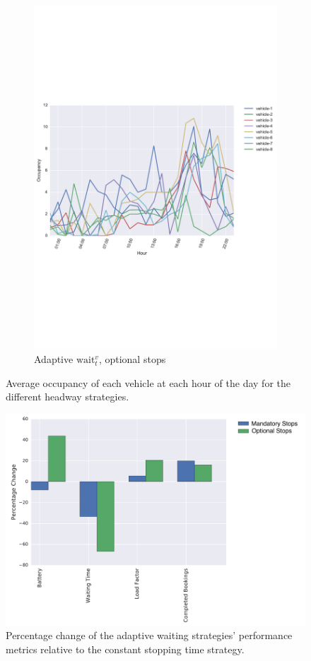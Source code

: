 \documentclass[12pt,a4paper]{article}
\begin{document}
\begin{figure}
\begin{subfigure}[b]{0.49\textwidth}
  \includegraphics[width=\linewidth]{./images/optionalstops}
  \caption{Adaptive $\text{wait}_t^{v}$, optional stops}
  \label{skipload}
\end{subfigure}
\label{simuload}
\caption{Average occupancy of each vehicle at each hour of the day for the different headway strategies.}
\end{figure}

\begin{figure}
  \centering
\includegraphics[scale=0.48]{./images/headwayCompare.pdf}
\caption{Percentage change of the adaptive waiting strategies' performance metrics relative to the constant stopping time strategy.}
\label{hwcompare}
\end{figure}
\end{document}
